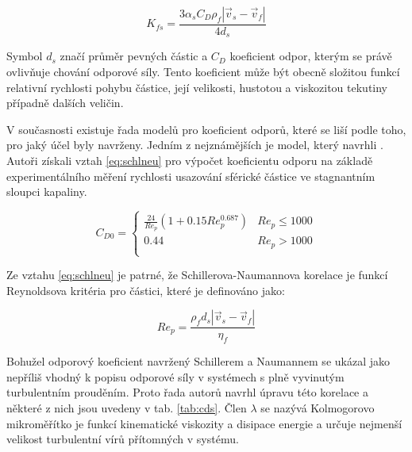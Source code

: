\begin{equation}
	K_{fs}= \frac{3\alpha_{s}C_{D}\rho_{f}|\vec{v}_{s} - \vec{v}_{f}|}{4d_{s}}
	\label{eq:kfs}
\end{equation}
  
\noindent Symbol $d_{s}$ značí průměr pevných částic a $C_{D}$ koeficient odpor, kterým se právě ovlivňuje chování odporové síly. Tento koeficient může být obecně složitou funkcí relativní rychlosti pohybu částice, její velikosti, hustotou a viskozitou tekutiny případně dalších veličin.   

V současnosti existuje řada modelů pro koeficient odporů, které se liší podle toho, pro jaký účel byly navrženy. Jedním z nejznámějších je model, který navrhli \citet{schi32}. Autoři získali vztah \ref{eq:schlneu} pro výpočet koeficientu odporu na základě experimentálního měření rychlosti usazování sférické částice ve stagnantním sloupci kapaliny.    
 
\begin{equation}
	\label{eq:schlneu}
  C_{D0} = \left\{ \begin{array}{ll}
  \frac{24}{Re_{p}}  \left( 1 + \num{0.15}Re_{p}^{\num{0.687}} \right) & Re_{p} \le 1000\\
  \num{0.44} & Re_{p} > 1000\\
  \end{array} \right.
\end{equation}

\noindent Ze vztahu \ref{eq:schlneu} je patrné, že Schillerova-Naumannova korelace je funkcí Reynoldsova kritéria pro částici, které je definováno jako:

\begin{equation}
	Re_{p}= \frac{\rho_{f}d_{s}|\vec{v}_{s} - \vec{v}_{f}|}{\eta_{f}}
	\label{eq:reyp}
\end{equation}

Bohužel odporový koeficient navržený Schillerem a Naumannem se ukázal jako nepříliš vhodný k popisu odporové síly v systémech s plně vyvinutým turbulentním prouděním. Proto řada autorů navrhl úpravu této korelace a některé z nich jsou uvedeny v tab. \ref{tab:cds}. Člen $\lambda$ se nazývá Kolmogorovo mikroměřítko je funkcí kinematické viskozity a disipace energie a určuje nejmenší velikost turbulentní vírů přítomných v systému. 

